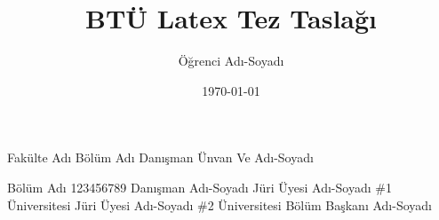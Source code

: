 \documentclass{btutez}
\title{BTÜ Latex Tez Taslağı}
\author{Öğrenci Adı-Soyadı}
\date{\today}
\begin{document}
	\tezibaslat

	\ickapak
		{Fakülte Adı}
		{Bölüm Adı}
		{Danışman Ünvan Ve Adı-Soyadı}

	\declaration
		{Bölüm Adı}
		{123456789}
		{Danışman Adı-Soyadı}
		{Jüri Üyesi Adı-Soyadı \#1}
		{Üniversitesi}
		{Jüri Üyesi Adı-Soyadı \#2}
		{Üniversitesi}
		{Bölüm Başkanı Adı-Soyadı}

	\startcontent
\end{document}

